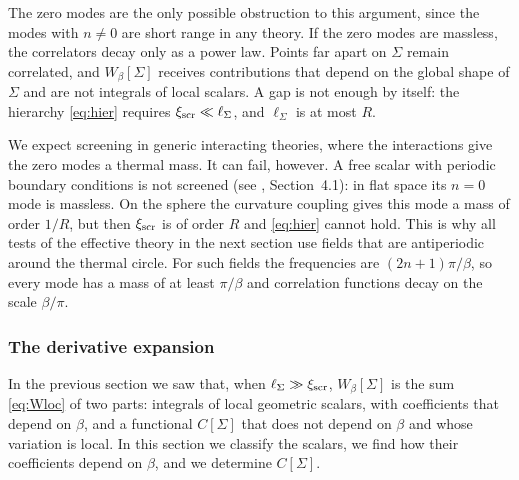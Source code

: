 \documentclass[a4paper,11pt]{article}
\newcommand{\xiscr}{\xi_{\rm scr}}
\begin{document}
The zero modes are the only possible obstruction to this argument, since the modes with $n\neq0$ are short range in any theory. If the zero modes are massless, the correlators decay only as a power law. Points far apart on $\Sigma$ remain correlated, and $W_\beta[\Sigma]$ receives contributions that depend on the global shape of $\Sigma$ and are not integrals of local scalars. A gap is not enough by itself: the hierarchy \eqref{eq:hier} requires $\xiscr\ll\ell_\Sigma$, and $\ell_\Sigma$ is at most $R$.

We expect screening in generic interacting theories, where the interactions give the zero modes a thermal mass. It can fail, however. A free scalar with periodic boundary conditions is not screened (see \cite{BMP}, Section~4.1): in flat space its $n=0$ mode is massless. On the sphere the curvature coupling gives this mode a mass of order $1/R$, but then $\xiscr$ is of order $R$ and \eqref{eq:hier} cannot hold. This is why all tests of the effective theory in the next section use fields that are antiperiodic around the thermal circle. For such fields the frequencies are $(2n+1)\pi/\beta$, so every mode has a mass of at least $\pi/\beta$ and correlation functions decay on the scale $\beta/\pi$.


\subsubsection{The derivative expansion}\label{sec:derexp}

In the previous section we saw that, when $\ell_\Sigma\gg\xiscr$, $W_\beta[\Sigma]$ is the sum \eqref{eq:Wloc} of two parts: integrals of local geometric scalars, with coefficients that depend on $\beta$, and a functional $C[\Sigma]$ that does not depend on $\beta$ and whose variation is local. In this section we classify the scalars, we find how their coefficients depend on $\beta$, and we determine $C[\Sigma]$.
\end{document}
